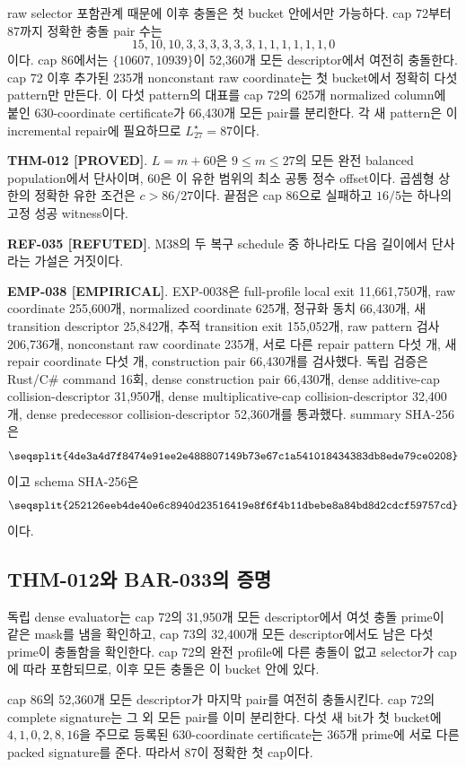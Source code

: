 \documentclass[11pt]{article}
\newcommand{\claimstatus}[2]{\textbf{#1 [#2]}}
\begin{document}
raw selector 포함관계 때문에 이후 충돌은 첫 bucket 안에서만
가능하다. cap 72부터 87까지 정확한 충돌 pair 수는
\[
15,10,10,3,3,3,3,3,3,1,1,1,1,1,1,0
\]
이다. cap 86에서는 \(\{10607,10939\}\)이 52,360개 모든
descriptor에서 여전히 충돌한다. cap 72 이후 추가된 235개
nonconstant raw coordinate는 첫 bucket에서 정확히 다섯 pattern만
만든다. 이 다섯 pattern의 대표를 cap 72의 625개 normalized column에
붙인 630-coordinate certificate가 66,430개 모든 pair를 분리한다.
각 새 pattern은 이 incremental repair에 필요하므로
\(L_{27}^\star=87\)이다.

\claimstatus{THM-012}{PROVED}.
\(L=m+60\)은 \(9\le m\le27\)의 모든 완전 balanced population에서
단사이며, 60은 이 유한 범위의 최소 공통 정수 offset이다. 곱셈형
상한의 정확한 유한 조건은 \(c>86/27\)이다. 끝점은 cap 86으로
실패하고 \(16/5\)는 하나의 고정 성공 witness이다.

\claimstatus{REF-035}{REFUTED}.
M38의 두 복구 schedule 중 하나라도 다음 길이에서 단사라는 가설은
거짓이다.

\claimstatus{EMP-038}{EMPIRICAL}.
EXP-0038은 full-profile local exit 11,661,750개, raw coordinate
255,600개, normalized coordinate 625개, 정규화 동치 66,430개,
새 transition descriptor 25,842개, 추적 transition exit 155,052개,
raw pattern 검사 206,736개, nonconstant raw coordinate 235개,
서로 다른 repair pattern 다섯 개, 새 repair coordinate 다섯 개,
construction pair 66,430개를 검사했다. 독립 검증은 Rust/C\# command
16회, dense construction pair 66,430개, dense additive-cap
collision-descriptor 31,950개, dense multiplicative-cap
collision-descriptor 32,400개, dense predecessor collision-descriptor
52,360개를 통과했다. summary SHA-256은
\[
\texttt{\seqsplit{4de3a4d7f8474e91ee2e488807149b73e67c1a541018434383db8ede79ce0208}}
\]
이고 schema SHA-256은
\[
\texttt{\seqsplit{252126eeb4de40e6c8940d23516419e8f6f4b11dbebe8a84bd8d2cdcf59757cd}}
\]
이다.

\subsection{THM-012와 BAR-033의 증명}

독립 dense evaluator는 cap 72의 31,950개 모든 descriptor에서 여섯
충돌 prime이 같은 mask를 냄을 확인하고, cap 73의 32,400개 모든
descriptor에서도 남은 다섯 prime이 충돌함을 확인한다. cap 72의
완전 profile에 다른 충돌이 없고 selector가 cap에 따라 포함되므로,
이후 모든 충돌은 이 bucket 안에 있다.

cap 86의 52,360개 모든 descriptor가 마지막 pair를 여전히
충돌시킨다. cap 72의 complete signature는 그 외 모든 pair를 이미
분리한다. 다섯 새 bit가 첫 bucket에 \(4,1,0,2,8,16\)을 주므로
등록된 630-coordinate certificate는 365개 prime에 서로 다른 packed
signature를 준다. 따라서 87이 정확한 첫 cap이다.
\end{document}
